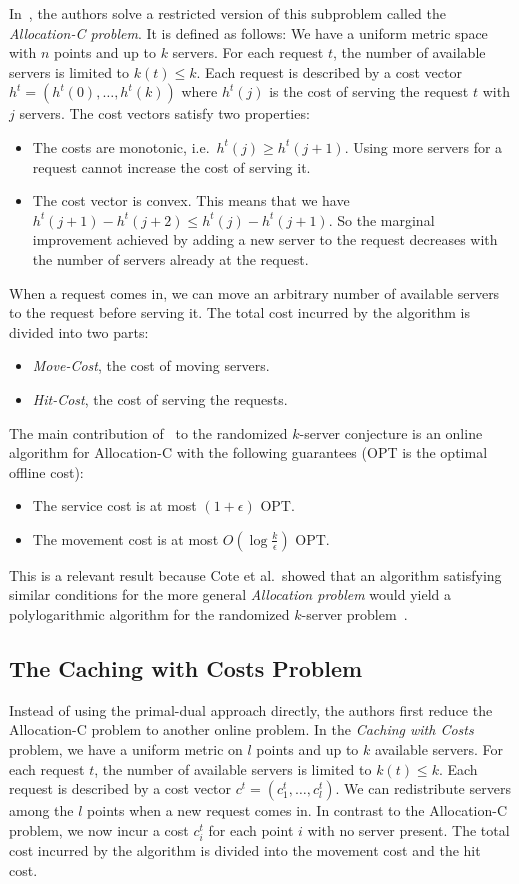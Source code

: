 In~\cite{bansal10:k-server}, the authors solve a restricted version of this subproblem called the \emph{Allocation-C problem}.
It is defined as follows:
We have a uniform metric space with $n$ points and up to $k$ servers.
For each request $t$, the number of available servers is limited to $k(t) \leq k$.
Each request is described by a cost vector $h^t = (h^t(0), \ldots, h^t(k))$ where $h^t(j)$ is the cost of serving the request $t$ with $j$ servers.
The cost vectors satisfy two properties:
\begin{itemize}
\item The costs are monotonic, i.e.\ $h^t(j) \geq h^t(j + 1)$.
Using more servers for a request cannot increase the cost of serving it.
\item The cost vector is convex.
This means that we have $h^t(j+1) - h^t(j +2) \leq h^t(j) - h^t(j + 1)$.
So the marginal improvement achieved by adding a new server to the request decreases with the number of servers already at the request.
\end{itemize}
When a request comes in, we can move an arbitrary number of available servers to the request before serving it.
The total cost incurred by the algorithm is divided into two parts:
\begin{itemize}
\item \emph{Move-Cost}, the cost of moving servers.
\item \emph{Hit-Cost}, the cost of serving the requests.
\end{itemize}

The main contribution of~\cite{bansal10:k-server} to the randomized $k$-server conjecture is an online algorithm for Allocation-C with the following guarantees (OPT is the optimal offline cost):
\begin{itemize}
\item The service cost is at most $(1+\epsilon)$ OPT.
\item The movement cost is at most $O(\log\frac{k}{\epsilon})$ OPT.
\end{itemize}
This is a relevant result because Cote et al.\ showed that an algorithm satisfying similar conditions for the more general \emph{Allocation problem} would yield a polylogarithmic algorithm for the randomized $k$-server problem~\cite{cote08:k-server}.


\subsection{The Caching with Costs Problem}
Instead of using the primal-dual approach directly, the authors first reduce the Allocation-C problem to another online problem.
In the \emph{Caching with Costs} problem, we have a uniform metric on $l$ points and up to $k$ available servers.
For each request $t$, the number of available servers is limited to $k(t) \leq k$.
Each request is described by a cost vector $c^t = (c_1^t, \ldots, c^t_l)$.
We can redistribute servers among the $l$ points when a new request comes in.
In contrast to the Allocation-C problem, we now incur a cost $c_i^t$ for each point $i$ with no server present.
The total cost incurred by the algorithm is divided into the movement cost and the hit cost.

